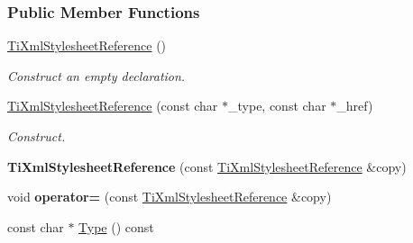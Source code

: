 \subsubsection*{Public Member Functions}
\begin{DoxyCompactItemize}
\item 
\hypertarget{class_ti_xml_stylesheet_reference_a1981b4e0d3368287dcac2dd7420eed2c}{
\hyperlink{class_ti_xml_stylesheet_reference_a1981b4e0d3368287dcac2dd7420eed2c}{TiXmlStylesheetReference} ()}
\label{class_ti_xml_stylesheet_reference_a1981b4e0d3368287dcac2dd7420eed2c}

\begin{DoxyCompactList}\small\item\em Construct an empty declaration. \item\end{DoxyCompactList}\item 
\hypertarget{class_ti_xml_stylesheet_reference_afe43839b8daab13a0df0dde48045f75e}{
\hyperlink{class_ti_xml_stylesheet_reference_afe43839b8daab13a0df0dde48045f75e}{TiXmlStylesheetReference} (const char $\ast$\_\-type, const char $\ast$\_\-href)}
\label{class_ti_xml_stylesheet_reference_afe43839b8daab13a0df0dde48045f75e}

\begin{DoxyCompactList}\small\item\em Construct. \item\end{DoxyCompactList}\item 
\hypertarget{class_ti_xml_stylesheet_reference_a2bc41307e5aeae81d62190efee5ea676}{
{\bfseries TiXmlStylesheetReference} (const \hyperlink{class_ti_xml_stylesheet_reference}{TiXmlStylesheetReference} \&copy)}
\label{class_ti_xml_stylesheet_reference_a2bc41307e5aeae81d62190efee5ea676}

\item 
\hypertarget{class_ti_xml_stylesheet_reference_a75202877062f107d429b8d601680db19}{
void {\bfseries operator=} (const \hyperlink{class_ti_xml_stylesheet_reference}{TiXmlStylesheetReference} \&copy)}
\label{class_ti_xml_stylesheet_reference_a75202877062f107d429b8d601680db19}

\item 
\hypertarget{class_ti_xml_stylesheet_reference_a3d970eb6637390f512a918ca0407cdc1}{
const char $\ast$ \hyperlink{class_ti_xml_stylesheet_reference_a3d970eb6637390f512a918ca0407cdc1}{Type} () const }
\label{class_ti_xml_stylesheet_reference_a3d970eb6637390f512a918ca0407cdc1}


\end{DoxyCompactItemize}
